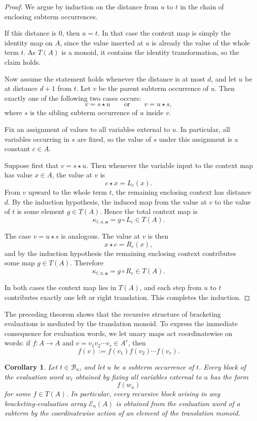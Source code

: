 \documentclass[11pt]{article}
\newtheorem{corollary}[theorem]{Corollary}
\begin{document}
\begin{proof}
We argue by induction on the distance from \(u\) to \(t\) in the chain of
enclosing subterm occurrences.

If this distance is \(0\), then \(u=t\). In that case the context map is simply
the identity map on \(A\), since the value inserted at \(u\) is already the
value of the whole term \(t\). As \(T(A)\) is a monoid, it contains the
identity transformation, so the claim holds.

Now assume the statement holds whenever the distance is at most \(d\), and let
\(u\) be at distance \(d+1\) from \(t\). Let \(v\) be the parent subterm
occurrence of \(u\). Then exactly one of the following two cases occurs:
\[
v=s\star u
\qquad\text{or}\qquad
v=u\star s,
\]
where \(s\) is the sibling subterm occurrence of \(u\) inside \(v\).

Fix an assignment of values to all variables external to \(u\). In particular,
all variables occurring in \(s\) are fixed, so the value of \(s\) under this
assignment is a constant \(c\in A\).

Suppose first that \(v=s\star u\). Then whenever the variable input to the
context map has value \(x\in A\), the value at \(v\) is
\[
c\star x=L_c(x).
\]
From \(v\) upward to the whole term \(t\), the remaining enclosing context has
distance \(d\). By the induction hypothesis, the induced map from the value at
\(v\) to the value of \(t\) is some element \(g\in T(A)\). Hence the total
context map is
\[
\kappa_{t,u,\mathbf a}=g\circ L_c \in T(A).
\]

The case \(v=u\star s\) is analogous. The value at \(v\) is then
\[
x\star c = R_c(x),
\]
and by the induction hypothesis the remaining enclosing context contributes some
map \(g\in T(A)\). Therefore
\[
\kappa_{t,u,\mathbf a}=g\circ R_c \in T(A).
\]

In both cases the context map lies in \(T(A)\), and each step from \(u\) to
\(t\) contributes exactly one left or right translation. This completes the
induction.
\end{proof}

The preceding theorem shows that the recursive structure of bracketing
evaluations is mediated by the translation monoid. To express the immediate
consequence for evaluation words, we let unary maps act coordinatewise on words:
if \(f:A\to A\) and \(v=v_1v_2\cdots v_r\in A^r\), then
\[
f(v):=f(v_1)f(v_2)\cdots f(v_r).
\]

\begin{corollary}\label{cor:recursive-blocks}
Let \(t\in \mathcal B_n\), and let \(u\) be a subterm occurrence of \(t\). Every
block of the evaluation word \(w_t\) obtained by fixing all variables external
to \(u\) has the form
\[
f(w_u)
\]
for some \(f\in T(A)\). In particular, every recursive block arising in any
bracketing-evaluation array \(\mathcal E_n(A)\) is obtained from the evaluation
word of a subterm by the coordinatewise action of an element of the translation
monoid.
\end{corollary}
\end{document}

